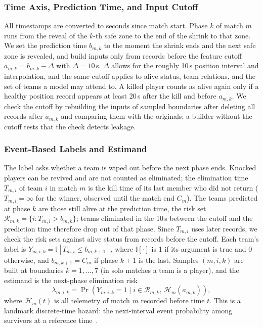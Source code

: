 \documentclass[conference]{IEEEtran}
\begin{document}
\subsubsection{Time Axis, Prediction Time, and Input Cutoff}
All timestamps are converted to seconds since match start.
Phase $k$ of match $m$ runs from the reveal of the $k$-th safe zone to the end of the shrink to that zone.
We set the prediction time $b_{m,k}$ to the moment the shrink ends and the next safe zone is revealed, and build inputs only from records before the feature cutoff $a_{m,k}=b_{m,k}-\Delta$ with $\Delta=10$\,s.
$\Delta$ allows for the roughly 10\,s position interval and interpolation, and the same cutoff applies to alive status, team relations, and the set of teams a model may attend to.
A killed player counts as alive again only if a healthy position record appears at least 20\,s after the kill and before $a_{m,k}$.
We check the cutoff by rebuilding the inputs of sampled boundaries after deleting all records after $a_{m,k}$ and comparing them with the originals; a builder without the cutoff tests that the check detects leakage.

\subsubsection{Event-Based Labels and Estimand}
The label asks whether a team is wiped out before the next phase ends.
Knocked players can be revived and are not counted as eliminated; the elimination time $T_{m,i}$ of team $i$ in match $m$ is the kill time of its last member who did not return ($T_{m,i}=\infty$ for the winner, observed until the match end $C_m$).
The teams predicted at phase $k$ are those still alive at the prediction time, the risk set $\mathcal{R}_{m,k}=\{i: T_{m,i}>b_{m,k}\}$; teams eliminated in the 10\,s between the cutoff and the prediction time therefore drop out of that phase. Since $T_{m,i}$ uses later records, we check the risk sets against alive status from records before the cutoff.
Each team's label is $Y_{m,i,k}=\mathbb{I}[T_{m,i}\le b_{m,k+1}]$, where $\mathbb{I}[\cdot]$ is 1 if its argument is true and 0 otherwise, and $b_{m,k+1}=C_m$ if phase $k+1$ is the last.
Samples $(m,i,k)$ are built at boundaries $k=1,\dots,7$ (in solo matches a team is a player), and the estimand is the next-phase elimination risk
\begin{equation}
\lambda_{m,i,k}=\Pr\!\left(Y_{m,i,k}=1 \mid i\in\mathcal{R}_{m,k},\,\mathcal{H}_{m}(a_{m,k})\right),
\label{eq:hazard}
\end{equation}
where $\mathcal{H}_{m}(t)$ is all telemetry of match $m$ recorded before time $t$.
This is a landmark discrete-time hazard: the next-interval event probability among survivors at a reference time~\cite{vanHouwelingen07}.
\end{document}
